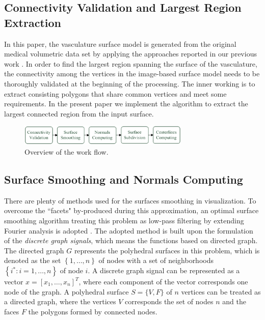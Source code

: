 
\subsection{Connectivity Validation and Largest Region Extraction}

In this paper, the vasculature surface model is generated from the original medical volumetric data set by applying the approaches reported in our previous work \cite{Yang2014ICRA}. %
In order to find the largest region spanning the surface of the vasculature, the connectivity among the vertices in the image-based surface model needs to be thoroughly validated at the beginning of the processing. %
The inner working is to extract consisting polygons that share common vertices and meet some requirements.
In the present paper we implement the algorithm to extract the largest connected region from the input surface.
\begin{figure}[t]
\centering
\includegraphics[width=3.2in]{Figures/chap05/DataFlow.png}
\caption{Overview of the work flow.}
\label{fig:DataFlow}
\end{figure}

\subsection{Surface Smoothing and Normals Computing}

There are plenty of methods used for the surfaces smoothing in visualization.
To overcome the ``facets" by-produced during this approximation, an optimal surface smoothing algorithm treating this problem as low-pass filtering by extending Fourier analysis is adopted \cite{Taubin1996}. %
The adopted method is built upon the formulation of the \emph{discrete graph signals}, which means the functions based on directed graph.
The directed graph $G$ represents the polyhedral surfaces in this problem, which is denoted as the set $\left\{ 1, \ldots, n \right\}$ of nodes with a set of neighborhoods $\left\{ i^{\ast}: i = 1, \ldots, n \right\}$ of node $i$. %
A discrete graph signal can be represented as a vector $x = \left[ x_1, \ldots, x_n \right]^T$, where each component of the vector corresponds one node of the graph.
A polyhedral surface $S = \{ V, F \}$ of $n$ vertices can be treated as a directed graph, where the vertices $V$ corresponds the set of nodes $n$ and the faces $F$ the polygons formed by connected nodes. %

